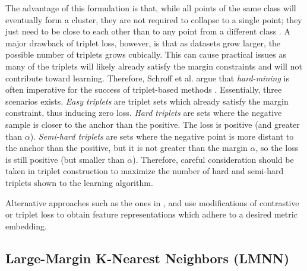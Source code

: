 	The advantage of this formulation is that, while all points of the same class will eventually form a cluster, they are not required to collapse to a single point; they just need to be close to each other than to any point from a different class \citep{Hermans2017DefenseTripletLoss}.  A major drawback of triplet loss, however, is that as datasets grow larger, the possible number of triplets grows cubically.  This can cause practical issues as many of the triplets will likely already satisfy the margin constraints and will not contribute toward learning.  Therefore, Schroff et al. argue that \textit{hard-mining} is often imperative for the success of triplet-based methods \citep{Schroff2015FaceNet}.   Essentially, three scenarios exists.  \textit{Easy triplets} are triplet sets which already satisfy the margin constraint, thus inducing zero loss.  \textit{Hard triplets} are sets where the negative sample is closer to the anchor than the positive.  The loss is positive (and greater than $\alpha$).  \textit{Semi-hard triplets} are sets where the negative point is more distant to the anchor than the positive, but it is not greater than the margin $\alpha$, so the loss is still positive (but smaller than $\alpha$).  Therefore, careful consideration should be taken in triplet construction to maximize the number of hard and semi-hard triplets shown to the learning algorithm. 
	
	Alternative approaches such as the ones in \citep{Sohn2016NPairLoss}, \citep{Deng2019ArcFaceAngularMarginLoss} and \citep{Xu2014LargeMarginWeaklySupervisedDR} use modifications of contrastive or triplet loss to obtain feature representations which adhere to a desired metric embedding.

		\subsection{Large-Margin K-Nearest Neighbors (LMNN)}
		
